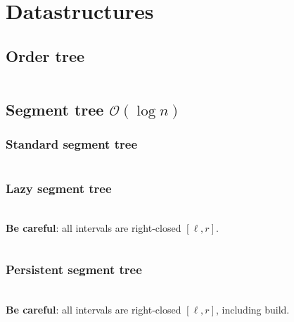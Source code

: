 \documentclass[9pt,a4paper,landscape,oneside]{amsart}
\newcommand{\mintedstyle}[2]{\inputminted{#1}{code/#2}}
\newcommand{\code}[1]{\mintedstyle{cpp}{#1}}
\newenvironment{myitemize}
{\begin{itemize}[leftmargin=.3cm]
	\setlength{\itemsep}{0pt}
	\setlength{\parskip}{0pt}
	\setlength{\parsep}{0pt}     }
{ \end{itemize}                  }
\begin{document}
\begin{multicols*}{3}
\begin{myitemize}
\end{myitemize}

\section{Datastructures}
\subsection{Order tree}
\code{datastructures/order_statistic.cc}

\subsection{Segment tree $\mathcal{O}(\log n)$}

\subsubsection{Standard segment tree}
\code{datastructures/segment_tree.cpp}

\subsubsection{Lazy segment tree} ~\\

\textbf{Be careful}: all intervals are right-closed $[\ell,r]$.
\code{datastructures/lazy_segment_tree.cpp}

\subsubsection{Persistent segment tree} ~\\

\textbf{Be careful}: all intervals are right-closed $[\ell,r]$, including build.
\code{datastructures/persistent_segment_tree.cpp}


\end{multicols*}
\end{document}
